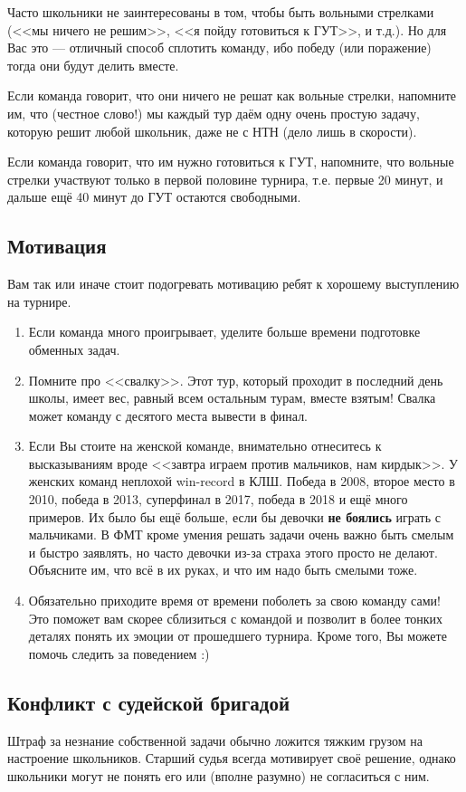 \documentclass[12pt]{article}
\begin{document}
Часто школьники не заинтересованы в том, чтобы быть вольными стрелками (<<мы ничего не решим>>, <<я пойду готовиться к ГУТ>>, и т.д.). Но для Вас это --- отличный способ сплотить команду, ибо победу (или поражение) тогда они будут делить вместе.

Если команда говорит, что они ничего не решат как вольные стрелки, напомните им, что (честное слово!) мы каждый тур даём одну очень простую задачу, которую решит любой школьник, даже не с НТН (дело лишь в скорости). 

Если команда говорит, что им нужно готовиться к ГУТ, напомните, что вольные стрелки участвуют только в первой половине турнира, т.е. первые 20 минут, и дальше ещё 40 минут до ГУТ остаются свободными.

\subsection*{Мотивация}
Вам так или иначе стоит подогревать мотивацию ребят к хорошему выступлению на турнире. 
\begin{enumerate}
	\item Если команда много проигрывает, уделите больше времени подготовке обменных задач.
	\item Помните про <<свалку>>. Этот тур, который проходит в последний день школы, имеет вес, равный всем остальным турам, вместе взятым! Свалка может команду с десятого места вывести в финал. 
	\item Если Вы стоите на женской команде, внимательно отнеситесь к высказываниям вроде <<завтра играем против мальчиков, нам кирдык>>. У женских команд неплохой win-record в КЛШ. Победа в 2008, второе место в 2010, победа в 2013, суперфинал в 2017, победа в 2018 и ещё много примеров. Их было бы ещё больше, если бы девочки {\bf не боялись} играть с мальчиками. В ФМТ кроме умения решать задачи очень важно быть смелым и быстро заявлять, но часто девочки из-за страха этого просто не делают. Объясните им, что всё в их руках, и что им надо быть смелыми тоже.
	\item Обязательно приходите время от времени поболеть за свою команду сами! Это поможет вам скорее сблизиться с командой и позволит в более тонких деталях понять их эмоции от прошедшего турнира. Кроме того, Вы можете помочь следить за поведением :)
\end{enumerate}

\subsection*{Конфликт с судейской бригадой}
Штраф за незнание собственной задачи обычно ложится тяжким грузом на настроение школьников. Старший судья всегда мотивирует своё решение, однако школьники могут не понять его или (вполне разумно) не согласиться с ним. 
\end{document}
